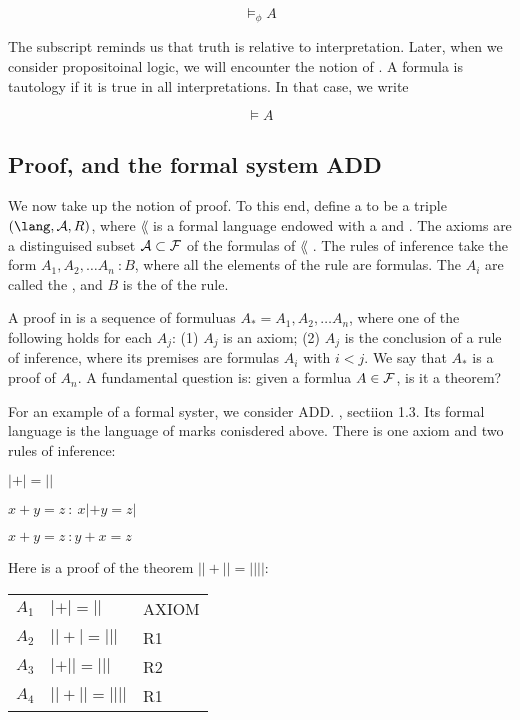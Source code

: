 $$
\models_{\phi} A
$$

The subscript reminds us that truth is relative to interpretation.  Later, when we consider propositoinal logic, we will encounter the notion of .  A formula is tautology if it is true in all interpretations.  In that case, we  write

$$
\models A
$$




\subsection{Proof, and the formal system ADD}

We now take up the notion of proof.  To this end, define 
 a    to be a triple 
$(\lang, \axioms, R)$, where $\lang$ is a formal language endowed with a  and .  The axioms are a distinguised subset  $\mathcal{A} \subset \mathcal{F}$ of the formulas of $\lang$ . The rules of inference take the form  $A_1, A_2, \ldots A_n\ : B$, where all the elements of the rule are formulas. The $A_i$  are called the , and $B$ is the  of the rule.

  A proof in  is a sequence of formuluas $A_* = A_1, A_2, \ldots A_n$, where one of the following holds for each $A_j$: (1) $A_j$ is an axiom; (2) $A_j$ is the conclusion of a rule of inference, where its premises are formulas $A_i$ with $i < j$.  We say that $A_*$ is a proof of $A_n$.  A fundamental question is: given a formlua $A \in \mathcal{F}$, is it a theorem?

For an example of a formal syster, we consider ADD. \cite{RH}, sectiion 1.3. Its formal language is the language of marks conisdered above.  There is one axiom and two rules of inference:

\begin{indent}
 $| + | = ||$
\end{indent}

\begin{indent}
 $x + y = z \ : \ x| + y = z|$
\end{indent}

\begin{indent}
 $x + y = z \ : y + x = z$
\end{indent}

Here is a proof of the theorem $|| + || = ||||$:

\begin{indent}
\begin{tabular}{lll}
$A_1$ & $| + | = ||$ & AXIOM \\
$A_2$ &$|| + | = |||$ & R1 \\
$A_3$ &$| + || = |||$ & R2 \\
$A_4$ &$|| + || = ||||$ & R1 \\
\end{tabular}
\end{indent}




